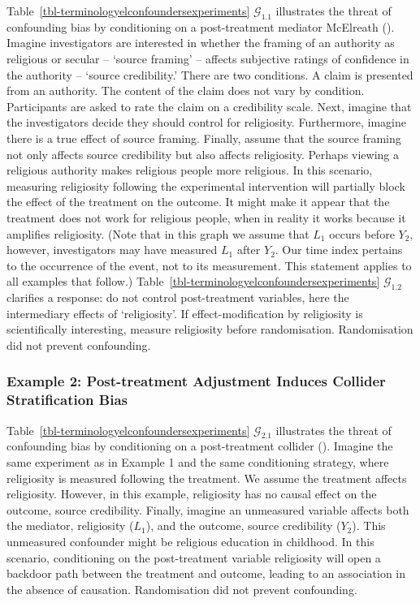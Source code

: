 \documentclass[
  single column]{article}
\begin{document}
Table~\ref{tbl-terminologyelconfoundersexperiments}
\(\mathcal{G}_{1.1}\) illustrates the threat of confounding bias by
conditioning on a post-treatment mediator McElreath
(). Imagine investigators are
interested in whether the framing of an authority as religious or
secular -- `source framing' -- affects subjective ratings of confidence
in the authority -- `source credibility.' There are two conditions. A
claim is presented from an authority. The content of the claim does not
vary by condition. Participants are asked to rate the claim on a
credibility scale. Next, imagine that the investigators decide they
should control for religiosity. Furthermore, imagine there is a true
effect of source framing. Finally, assume that the source framing not
only affects source credibility but also affects religiosity. Perhaps
viewing a religious authority makes religious people more religious. In
this scenario, measuring religiosity following the experimental
intervention will partially block the effect of the treatment on the
outcome. It might make it appear that the treatment does not work for
religious people, when in reality it works because it amplifies
religiosity. (Note that in this graph we assume that \(L_1\) occurs
before \(Y_2\), however, investigators may have measured \(L_1\) after
\(Y_2\). Our time index pertains to the occurrence of the event, not to
its measurement. This statement applies to all examples that follow.)
Table~\ref{tbl-terminologyelconfoundersexperiments}
\(\mathcal{G}_{1.2}\) clarifies a response: do not control
post-treatment variables, here the intermediary effects of
`religiosity'. If effect-modification by religiosity is scientifically
interesting, measure religiosity before randomisation. Randomisation did
not prevent confounding.

\subsubsection{Example 2: Post-treatment Adjustment Induces Collider
Stratification
Bias}\label{example-2-post-treatment-adjustment-induces-collider-stratification-bias}

Table~\ref{tbl-terminologyelconfoundersexperiments}
\(\mathcal{G}_{2.1}\) illustrates the threat of confounding bias by
conditioning on a post-treatment collider (). Imagine the same experiment as in Example 1 and the same
conditioning strategy, where religiosity is measured following the
treatment. We assume the treatment affects religiosity. However, in this
example, religiosity has no causal effect on the outcome, source
credibility. Finally, imagine an unmeasured variable affects both the
mediator, religiosity (\(L_1\)), and the outcome, source credibility
(\(Y_2\)). This unmeasured confounder might be religious education in
childhood. In this scenario, conditioning on the post-treatment variable
religiosity will open a backdoor path between the treatment and outcome,
leading to an association in the absence of causation. Randomisation did
not prevent confounding.
\end{document}
